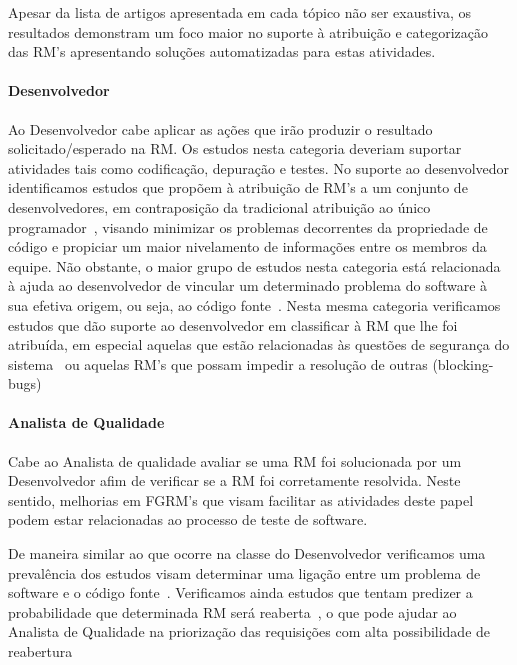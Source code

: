 Apesar da lista de artigos apresentada em cada tópico não ser exaustiva, os
resultados demonstram um foco maior no suporte à atribuição e categorização das
RM's apresentando soluções automatizadas para estas atividades.


\paragraph{Desenvolvedor} Ao Desenvolvedor cabe aplicar as ações que irão
produzir o resultado solicitado/esperado na RM\@. Os estudos nesta categoria
deveriam suportar atividades tais como codificação, depuração e testes. No
suporte ao desenvolvedor identificamos estudos que propõem à atribuição de RM's
a um conjunto de desenvolvedores, em contraposição da tradicional atribuição ao
único programador~\cite{banitaan2013decoba}, visando  minimizar os pro\-ble\-mas
decorrentes da propriedade de código e propiciar um maior nivelamento de
informações entre os membros da equipe. Não obstante, o maior grupo de estudos
nesta categoria está relacionada à ajuda ao desenvolvedor de vincular um
determinado problema do software à sua efetiva origem, ou seja, ao código
fonte~\cite{corley2011recovering,Wong:2014:BBF:2705615.2706096,
	Thung:2014:BIT:2635868.2661678,Nguyen:2012:MAR:2393596.2393671,thung2013automatic,
	Romo:2015:TAT:2745802.2745833}. Nesta mesma categoria verificamos estudos
que dão suporte ao desenvolvedor em classificar à RM que lhe foi atribuída, em
especial aquelas que estão relacionadas às questões de segurança do
sistema~\cite{gegick2010identifying} ou aquelas RM's que possam impedir a
resolução de outras
(blocking-bugs)~\cite{ValdiviaGarcia:2014:CPB:2597073.2597099}

\paragraph{Analista de Qualidade} Cabe ao Analista de qualidade avaliar se uma
RM foi solucionada por um Desenvolvedor afim de verificar se a RM foi
corretamente resolvida. Neste sentido, melhorias em FGRM's que visam facilitar
as atividades deste papel podem estar relacionadas ao processo de teste de
software.

De maneira similar ao que ocorre na classe do Desenvolvedor verificamos uma
prevalência dos estudos visam determinar uma ligação entre um problema de
software e o código
fonte~\cite{corley2011recovering,Wong:2014:BBF:2705615.2706096,
	Thung:2014:BIT:2635868.2661678,Nguyen:2012:MAR:2393596.2393671,thung2013automatic,
	Romo:2015:TAT:2745802.2745833}. Verificamos ainda estudos que tentam
predizer a probabilidade que determinada RM será
reaberta~\cite{xia2015automatic}, o que pode ajudar ao Analista de Qualidade na
priorização das requisições com alta possibilidade de reabertura

